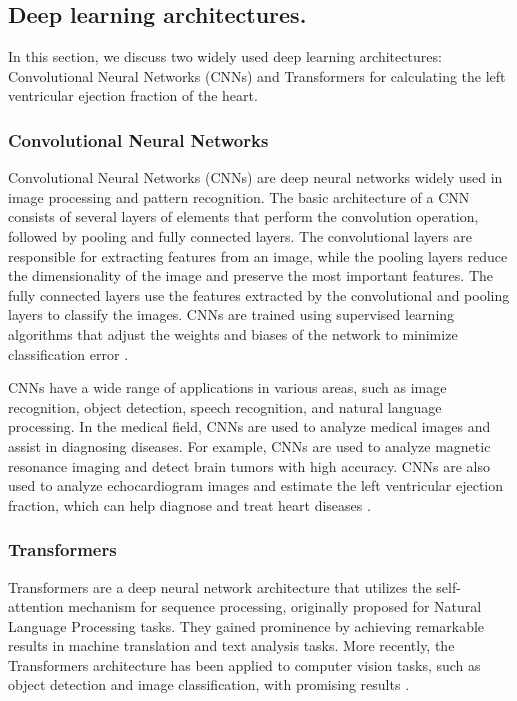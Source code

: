 \documentclass[a4paper,fleqn]{cas-dc}
\begin{document}
\subsection{Deep learning architectures.}

In this section, we discuss two widely used deep learning architectures: Convolutional Neural Networks (CNNs) and Transformers for calculating the left ventricular ejection fraction of the heart.

\subsubsection{Convolutional Neural Networks}

Convolutional Neural Networks (CNNs) are deep neural networks widely used in image processing and pattern recognition. The basic architecture of a CNN consists of several layers of elements that perform the convolution operation, followed by pooling and fully connected layers. The convolutional layers are responsible for extracting features from an image, while the pooling layers reduce the dimensionality of the image and preserve the most important features. The fully connected layers use the features extracted by the convolutional and pooling layers to classify the images. CNNs are trained using supervised learning algorithms that adjust the weights and biases of the network to minimize classification error \cite{IZADKHAH2022175}.

CNNs have a wide range of applications in various areas, such as image recognition, object detection, speech recognition, and natural language processing. In the medical field, CNNs are used to analyze medical images and assist in diagnosing diseases. For example, CNNs are used to analyze magnetic resonance imaging and detect brain tumors with high accuracy. CNNs are also used to analyze echocardiogram images and estimate the left ventricular ejection fraction, which can help diagnose and treat heart diseases \cite{IZADKHAH2022175, HE2022}.

\subsubsection{Transformers}

Transformers are a deep neural network architecture that utilizes the self-attention mechanism for sequence processing, originally proposed for Natural Language Processing tasks. They gained prominence by achieving remarkable results in machine translation and text analysis tasks. More recently, the Transformers architecture has been applied to computer vision tasks, such as object detection and image classification, with promising results \cite{RUAN20221}.
\end{document}
